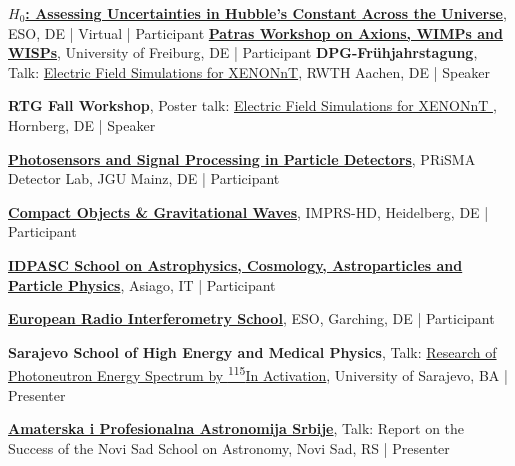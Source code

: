 \begin{scholarship}
                    {\href{https://www.eso.org/sci/meetings/2020/H0.html}{\textbf{${H_0}$: Assessing Uncertainties in Hubble’s Constant Across the Universe}}, ESO, DE | Virtual | Participant}
                    {\href{https://axion-wimp2019.desy.de/}{\textbf{Patras Workshop on Axions, WIMPs and WISPs}}, University of Freiburg, DE | Participant}
	                {\textbf{DPG-Frühjahrstagung}, Talk:  \href{https://www.dpg-verhandlungen.de/year/2019/conference/aachen/part/t/session/31/contribution/2}{{Electric Field Simulations for XENONnT\textsuperscript{\faLink}}}, RWTH Aachen, DE | Speaker}
	                
		            {\textbf{RTG Fall Workshop}, Poster talk: \href{https://www.grk2044.uni-freiburg.de/dateien/dateien/programme2018}{{Electric Field Simulations for XENONnT \textsuperscript{\faLink}}}, Hornberg, DE | Speaker}
					
	               {\href{https://indico.mitp.uni-mainz.de/event/142/}{\textbf{Photosensors and Signal Processing in Particle Detectors}}, PRiSMA Detector Lab, JGU Mainz, DE | Participant}

                     {\href{https://www.imprs-hd.mpg.de/241582/Summer-School-2017}{\textbf{Compact Objects \& Gravitational Waves}}, IMPRS-HD, Heidelberg, DE | Participant}
                     
                     {\href{http://events.idpasc.lip.pt/LIP/events/2017_idpasc_school/}{\textbf{IDPASC School on Astrophysics, Cosmology, Astroparticles and Particle Physics}}, Asiago, IT | Participant}

                     {\href{https://www.eso.org/sci/meetings/2015/eris2015.html}{\textbf{European Radio Interferometry School}}, ESO, Garching, DE | Participant}  
                     
                     {{\textbf{Sarajevo School of High Energy and Medical Physics}}, Talk: \href{https://www.ifmp.eu/sshemp-page-3.htm}{Research of Photoneutron Energy Spectrum by \textsuperscript{115}In Activation\textsuperscript{\faLink}}, University of Sarajevo, BA | Presenter}

                     {\href{https://www.adnos.org/vesti.php?id=22}{\textbf{Amaterska i Profesionalna Astronomija Srbije}}, Talk: Report on the Success of the Novi Sad School on Astronomy, Novi Sad, RS | Presenter}
                     

\end{scholarship}

